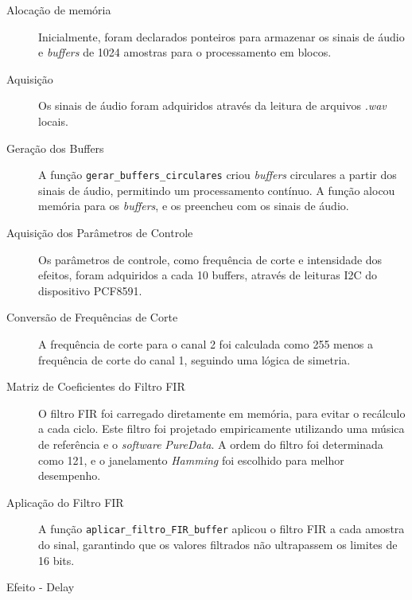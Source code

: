 \begin{description}
    \item[Alocação de memória] Inicialmente, foram declarados ponteiros para armazenar os sinais de áudio e \textit{buffers} de 1024 amostras para o processamento em blocos.
    \item [Aquisição] Os sinais de áudio foram adquiridos através da leitura de arquivos \textit{.wav} locais.%

\item [Geração dos Buffers]

A função \verb|gerar_buffers_circulares| criou \textit{buffers} circulares a partir dos sinais de áudio, permitindo um processamento contínuo. A função alocou memória para os \textit{buffers}, e os preencheu com os sinais de áudio.

\item [Aquisição dos Parâmetros de Controle]

Os parâmetros de controle, como frequência de corte e intensidade dos efeitos, foram adquiridos a cada 10 buffers, através de leituras I2C do dispositivo PCF8591.

\item [Conversão de Frequências de Corte]

A frequência de corte para o canal 2 foi calculada como 255 menos a frequência de corte do canal 1, seguindo uma lógica de simetria.
\item [Matriz de Coeficientes do Filtro FIR]

O filtro FIR foi carregado diretamente em memória, para evitar o recálculo a cada ciclo. Este filtro foi projetado empiricamente utilizando uma música de referência e o \textit{software} \textit{PureData}. A ordem do filtro foi determinada como 121, e o janelamento \textit{Hamming} foi escolhido para melhor desempenho.

\item [Aplicação do Filtro FIR]

A função \verb|aplicar_filtro_FIR_buffer| aplicou o filtro FIR a cada amostra do sinal, garantindo que os valores filtrados não ultrapassem os limites de 16 bits.

\item [Efeito - Delay]


\end{description}
